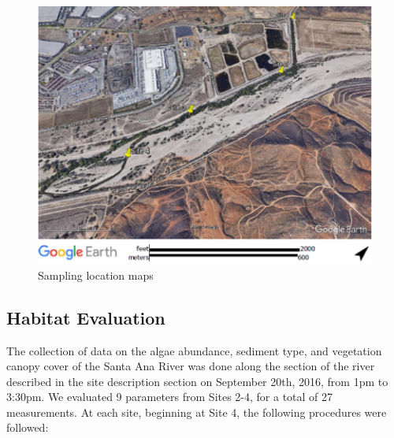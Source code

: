 \documentclass{article}
\begin{document}
\begin{figure}[!ht]
\includegraphics[width=1.00\textwidth]{Figures/SiteMap}
\caption{Sampling location maps}
\label{SAR_Image}
\end{figure}

\subsection{Habitat Evaluation}

The collection of data on the algae abundance, sediment type, and vegetation canopy cover of the Santa Ana River was done along the section of the river described in the site description section on September 20th, 2016, from 1pm to 3:30pm. We evaluated 9 parameters from Sites 2-4, for a total of 27 measurements. At each site, beginning at Site 4, the following procedures were followed: 
\end{document}
